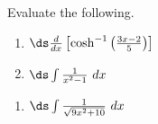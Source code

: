 {Evaluate the following.

\noindent%
\begin{minipage}[t]{.5\textwidth}
\begin{enumerate}
\item	$\ds \frac{d}{dx}\left[\cosh^{-1}\left(\frac{3x-2}{5}\right)\right]$
\item	$\ds \int\frac{1}{x^2-1}\ dx$
\end{enumerate}
\end{minipage}
\begin{minipage}[t]{.5\textwidth}
\begin{enumerate}\addtocounter{enumi}{2}
\item	$\ds \int \frac{1}{\sqrt{9x^2+10}}\ dx$
\end{enumerate}
\end{minipage}
}

